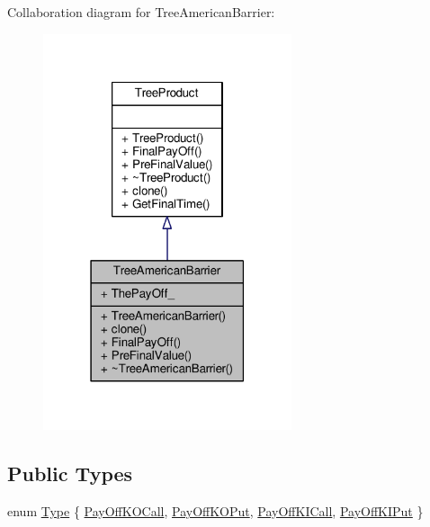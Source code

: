 Collaboration diagram for Tree\+American\+Barrier\+:
\nopagebreak
\begin{figure}[H]
\begin{center}
\leavevmode
\includegraphics[width=207pt]{classTreeAmericanBarrier__coll__graph}
\end{center}
\end{figure}
\subsection*{Public Types}
\begin{DoxyCompactItemize}
\item 
enum \hyperlink{classTreeAmericanBarrier_a52c7d9a606b0075d8d1b69c877771cbb}{Type} \{ \hyperlink{classTreeAmericanBarrier_a52c7d9a606b0075d8d1b69c877771cbba9a1ef199e0c0f3e15e20087cecfeb650}{Pay\+Off\+K\+O\+Call}, 
\hyperlink{classTreeAmericanBarrier_a52c7d9a606b0075d8d1b69c877771cbba8bdc8f8e0877e620e517197d3f466d50}{Pay\+Off\+K\+O\+Put}, 
\hyperlink{classTreeAmericanBarrier_a52c7d9a606b0075d8d1b69c877771cbba177db45433de276900e92cf4b54dbff3}{Pay\+Off\+K\+I\+Call}, 
\hyperlink{classTreeAmericanBarrier_a52c7d9a606b0075d8d1b69c877771cbba07234b5bb2685df5d0c5cb23192e34f7}{Pay\+Off\+K\+I\+Put}
 \}
\end{DoxyCompactItemize}
